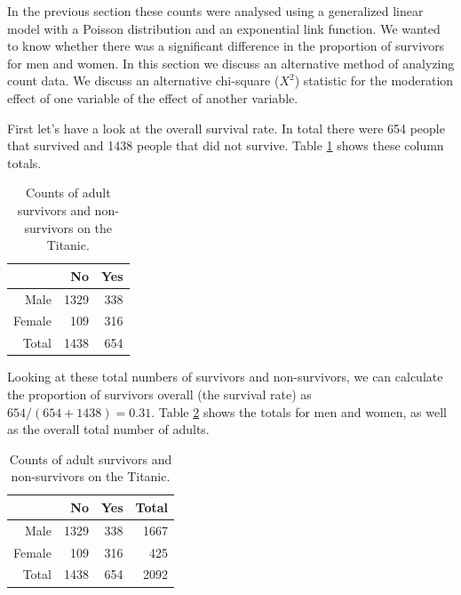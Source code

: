 \documentclass[]{book}\usepackage[]{graphicx}\usepackage[]{color}
\begin{document}
In the previous section these counts were analysed using a generalized linear model with a Poisson distribution and an exponential link function. We wanted to know whether there was a significant difference in the proportion of survivors for men and women. In this section we discuss an alternative method of analyzing count data. We discuss an alternative chi-square ($X^2$) statistic for the moderation effect of one variable of the effect of another variable.

First let's have a look at the overall survival rate. In total there were 654 people that survived and 1438 people that did not survive. Table \ref{tab:gen_25} shows these column totals.

\begin{table}[ht]
\centering
\caption{Counts of adult survivors and non-survivors on the Titanic.} 
\label{tab:gen_25}
\begin{tabular}{rrr}
  & No & Yes \\ 
  \hline
Male & 1329 & 338 \\ 
  Female & 109 & 316 \\ 
   \hline
Total & 1438 & 654 \\ 
   \hline
\end{tabular}
\end{table}


Looking at these total numbers of survivors and non-survivors, we can calculate the proportion of survivors overall (the survival rate) as $654/(654+1438)= 0.31$. Table \ref{tab:gen_26} shows the totals for men and women, as well as the overall total number of adults.



\begin{table}[ht]
\centering
\caption{Counts of adult survivors and non-survivors on the Titanic.} 
\label{tab:gen_26}
\begin{tabular}{rrrr}
  & No & Yes & Total \\ 
  \hline
Male & 1329 & 338 & 1667 \\ 
  Female & 109 & 316 & 425 \\ 
   \hline
Total & 1438 & 654 & 2092 \\ 
   \hline
\end{tabular}
\end{table}
\end{document}
